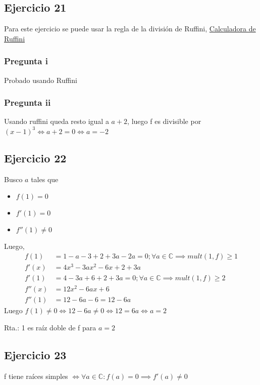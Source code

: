 \subsection{Ejercicio 21}

Para este ejercicio se puede usar la regla de la división de Ruffini, 
\href{https://calculadorasonline.com/calculadora-de-division-sintetica-regla-de-ruffini-online/}{Calculadora de Ruffini}
\subsubsection{Pregunta i}
Probado usando Ruffini

\subsubsection{Pregunta ii}
Usando ruffini queda resto igual a $ a+2 $, luego f es divisible por $(x-1)^3 \iff a+2 = 0 \iff a = -2$

\subsection{Ejercicio 22}

Busco $a$ tales que
\begin{itemize}
    \item $ f(1) = 0 $
    \item $ f'(1) = 0 $
    \item $ f''(1) \neq 0 $
\end{itemize}
Luego,
\begin{align*}
    f(1) &= 1-a-3+2+3a-2a = 0; \forall a \in \mathbb{C} \implies mult(1, f) \geq 1 \\
    f'(x) &= 4x^3 - 3ax^2  -6x + 2 + 3a \\
    f'(1) &= 4-3a+6+2+3a = 0; \forall a \in \mathbb{C} \implies mult(1, f) \geq 2 \\
    f''(x) &= 12x^2 - 6ax + 6 \\
    f''(1) &= 12-6a-6 = 12-6a
\end{align*}
Luego $f(1) \neq 0 \iff 12-6a \neq 0 \iff 12 = 6a \iff a = 2 $

Rta.: 1 es raíz doble de f para $ a = 2 $

\subsection{Ejercicio 23}

f tiene raíces simples $ \iff \forall a \in \mathbb{C}: f(a) = 0 \implies f'(a) \neq 0 $

